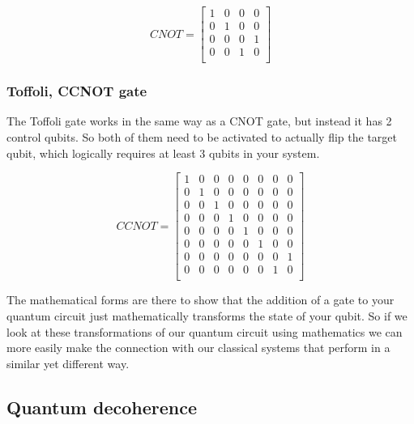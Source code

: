  \[
 CNOT=
 \begin{bmatrix}
 1 & 0 & 0 & 0 \\
 0 & 1 & 0 & 0 \\
 0 & 0 & 0 & 1 \\
 0 & 0 & 1 & 0 \\	
 \end{bmatrix}
 \]

\subsubsection{Toffoli, CCNOT gate}
The Toffoli gate works in the same way as a CNOT gate, but instead it has 2 control qubits. So both of them need to be activated to actually flip the target qubit, which logically requires at least 3 qubits in your system.

 \[
CCNOT=
\begin{bmatrix}
1 & 0 & 0 & 0 & 0 & 0 & 0 & 0\\
0 & 1 & 0 & 0 & 0 & 0 & 0 & 0\\
0 & 0 & 1 & 0 & 0 & 0 & 0 &  0\\
0 & 0 & 0 & 1 & 0 & 0 & 0  & 0\\
0 & 0 & 0 & 0 & 1 & 0 & 0  & 0\\
0 & 0 & 0 & 0 & 0 & 1 & 0  & 0\\
0 & 0 & 0 & 0 & 0 & 0 & 0 & 1 \\
0 & 0 & 0 & 0 & 0 & 0 & 1 & 0\\
\end{bmatrix}
\]

The mathematical forms are there to show that the addition of a gate to your quantum circuit just mathematically transforms the state of your qubit. So if we look at these transformations of our quantum circuit using mathematics we can more easily make the connection with our classical systems that perform in a similar yet different way.

\subsection{Quantum decoherence}

